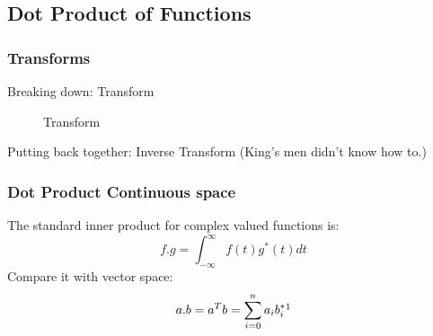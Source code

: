 \documentclass{beamer}
\newtheorem{Key points}{Key points}
\begin{document}
\subsection{Dot Product of Functions}
\begin{frame}
  \frametitle{Transforms}
\large
{\color{blue}Breaking down:} Transform \\
   \begin{figure}
\centering
{} 
\caption{Transform}
\end{figure}
 {\color{blue}Putting back together:} Inverse Transform (King's men didn't know how to.)
\end{frame}
\begin{frame}
  \frametitle{Dot Product Continuous space}
  The standard inner product for complex valued functions is:
  \begin{equation*}
    f.g= \int_{-\infty}^{\infty}{f(t)g^*(t)dt}    \end{equation*}
Compare it with vector space:
\begin{equation*}
    a.b= a^Tb = \sum_{i=0}^n{a_ib_i^*}   \footnotemark 
\end{equation*}
\end{frame}
\end{document}
